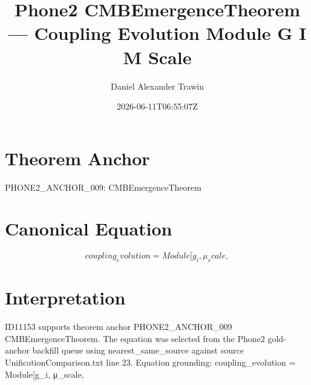 \documentclass[11pt]{article}
\title{Phone2 CMBEmergenceTheorem — Coupling Evolution Module G I Μ Scale}
\author{Daniel Alexander Trawin}
\date{2026-06-11T06:55:07Z}
\begin{document}
\maketitle
\section*{Theorem Anchor}
PHONE2_ANCHOR_009: CMBEmergenceTheorem
\section*{Canonical Equation}
\[
coupling_evolution = Module[{g_i, μ_scale},
\]
\section*{Interpretation}
ID11153 supports theorem anchor PHONE2_ANCHOR_009 CMBEmergenceTheorem. The equation was selected from the Phone2 gold-anchor backfill queue using nearest_same_source against source UnificationComparison.txt line 23. Equation grounding: coupling_evolution = Module[{g_i, μ_scale},
\end{document}
